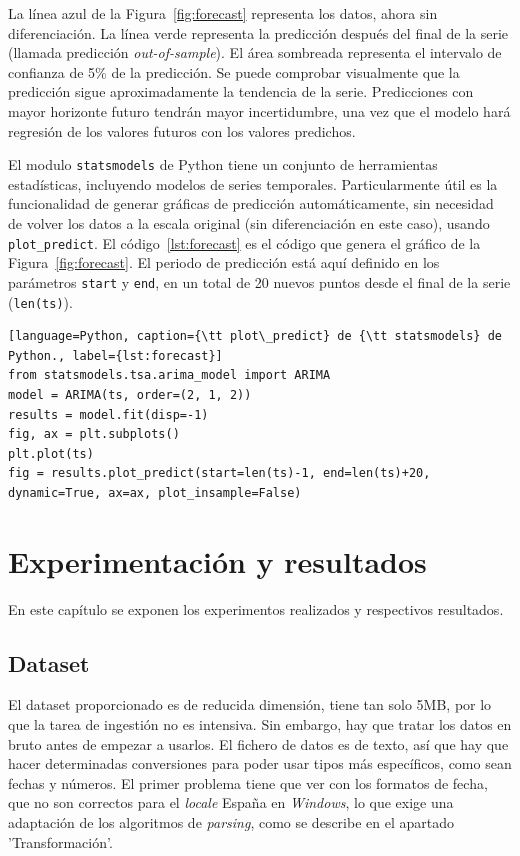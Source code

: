 \documentclass[11pt,spanish,listoffigures,listoftables]{tfgetsinf}
\begin{document}
    La línea azul de la Figura~\ref{fig:forecast} representa los datos, ahora sin diferenciación. La línea verde representa la predicción después del final de la serie (llamada predicción {\em out-of-sample}). El área sombreada representa el intervalo de confianza de 5\% de la predicción. Se puede comprobar visualmente que la predicción sigue aproximadamente la tendencia de la serie. Predicciones con mayor horizonte futuro tendrán mayor incertidumbre, una vez que el modelo hará regresión de los valores futuros con los valores predichos.

    El modulo {\tt statsmodels} de Python tiene un conjunto de herramientas estadísticas, incluyendo modelos de series temporales. Particularmente útil es la funcionalidad de generar gráficas de predicción automáticamente, sin necesidad de volver los datos a la escala original (sin diferenciación en este caso), usando {\tt plot\_predict}. El código~\ref{lst:forecast} es el código que genera el gráfico de la Figura~\ref{fig:forecast}. El periodo de predicción está aquí definido en los parámetros {\tt start} y {\tt end}, en un total de 20 nuevos puntos desde el final de la serie ({\tt len(ts)}).

    \begin{lstlisting}[language=Python, caption={\tt plot\_predict} de {\tt statsmodels} de Python., label={lst:forecast}]
from statsmodels.tsa.arima_model import ARIMA
model = ARIMA(ts, order=(2, 1, 2))
results = model.fit(disp=-1)
fig, ax = plt.subplots()
plt.plot(ts)
fig = results.plot_predict(start=len(ts)-1, end=len(ts)+20, dynamic=True, ax=ax, plot_insample=False)
    \end{lstlisting}


\chapter{Experimentación y resultados}
En este capítulo se exponen los experimentos realizados y respectivos resultados.

    \section{Dataset}
    El dataset proporcionado es de reducida dimensión, tiene tan solo 5MB, por lo que la tarea de ingestión no es intensiva. Sin embargo, hay que tratar los datos en bruto antes de empezar a usarlos. El fichero de datos es de texto, así que hay que hacer determinadas conversiones para poder usar tipos más específicos, como sean fechas y números. El primer problema tiene que ver con los formatos de fecha, que no son correctos para el {\em locale} España en {\em Windows}, lo que exige una adaptación de los algoritmos de {\em parsing}, como se describe en el apartado 'Transformación'.
    
\end{document}
